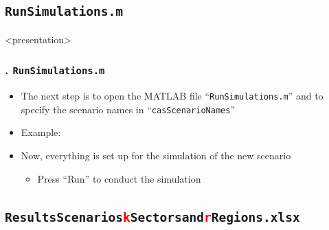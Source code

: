 \documentclass[11pt,aspectratio=169]{beamer}
\begin{document}
\subsection{\texttt{RunSimulations.m}}

\begin{frame}<presentation>
	\frametitle{{\thesection.\thesubsection} \texttt{RunSimulations.m}}
	\begin{itemize}
		\item The next step is to open the MATLAB file ``\texttt{RunSimulations.m}'' and to specify the scenario names in ``\texttt{casScenarioNames}''
		\item Example:
		\begin{figure}
		\end{figure}
		\item Now, everything is set up for the simulation of the new scenario
		\begin{itemize}
			\item Press ``Run'' to conduct the simulation
		\end{itemize}
	\end{itemize}
\end{frame}

\subsection{\texttt{ResultsScenarios\textcolor{red}{k}Sectorsand\textcolor{red}{r}Regions.xlsx}}
\end{document}
